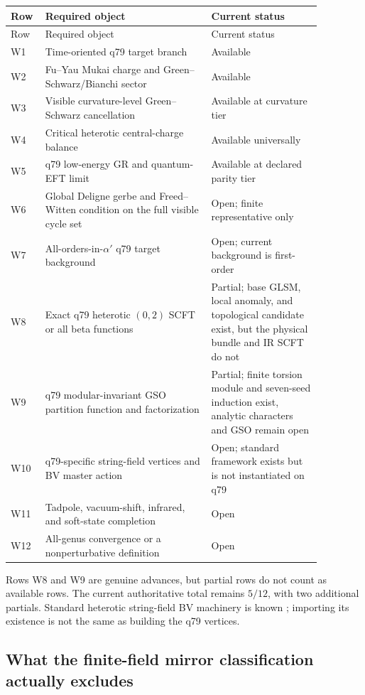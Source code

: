 \documentclass[11pt]{article}
\begin{document}
\begin{longtable}{p{0.07\linewidth}p{0.48\linewidth}p{0.32\linewidth}}
\toprule
Row & Required object & Current status\\
\midrule
\endfirsthead
\toprule
Row & Required object & Current status\\
\midrule
\endhead
W1 & Time-oriented q79 target branch & Available\\
W2 & Fu--Yau Mukai charge and Green--Schwarz/Bianchi sector & Available\\
W3 & Visible curvature-level Green--Schwarz cancellation & Available at
curvature tier\\
W4 & Critical heterotic central-charge balance & Available universally\\
W5 & q79 low-energy GR and quantum-EFT limit & Available at declared parity
tier\\
W6 & Global Deligne gerbe and Freed--Witten condition on the full visible
cycle set & Open; finite representative only\\
W7 & All-orders-in-\(\alpha'\) q79 target background & Open; current
background is first-order\\
W8 & Exact q79 heterotic \((0,2)\) SCFT or all beta functions & Partial;
base GLSM, local anomaly, and topological candidate exist, but the physical
bundle and IR SCFT do not\\
W9 & q79 modular-invariant GSO partition function and factorization &
Partial; finite torsion module and seven-seed induction exist, analytic
characters and GSO remain open\\
W10 & q79-specific string-field vertices and BV master action & Open;
standard framework exists but is not instantiated on q79\\
W11 & Tadpole, vacuum-shift, infrared, and soft-state completion & Open\\
W12 & All-genus convergence or a nonperturbative definition & Open\\
\bottomrule
\end{longtable}

Rows W8 and W9 are genuine advances, but partial rows do not count as
available rows. The current authoritative total remains \(5/12\), with two
additional partials. Standard heterotic string-field BV machinery is known
\cite{SenHeteroticBV}; importing its existence is not the same as building
the q79 vertices.

\subsection{What the finite-field mirror classification actually excludes}
\label{sec:mirror-classification}
\end{document}
